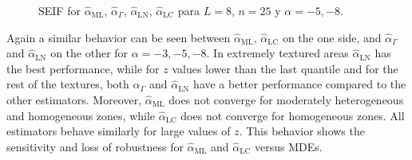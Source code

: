 \documentclass[twocolumn]{svjour3}
\begin{document}
\begin{figure}[htb]
	\centering
	\caption{\label{SEIFL8b}\small SEIF for $\widehat{\alpha}_{\text{{ML}}}$, $\widehat{\alpha}_{\Gamma}$, $\widehat{\alpha}_{\text{{LN}}}$, $\widehat{\alpha}_{\text{{LC}}}$ para $L=8$, $n=25$ y $\alpha=-5,-8$.}
\end{figure}

Again a similar behavior can be seen between $\widehat{\alpha}_{\text{{ML}}}$, $\widehat{\alpha}_{\text{{LC}}}$ on the one side, and $\widehat{\alpha}_{\Gamma}$ and $\widehat{\alpha}_{\text{{LN}}}$ on the other for $\alpha=-3, -5, -8$. 
In extremely textured areas $\widehat{\alpha}_{\text{{LN}}}$ has the best performance, while for $z$ values lower than the last quantile and for the rest of the textures, both $\widehat{\alpha}_{\Gamma}$ and $\widehat{\alpha}_{\text{{LN}}}$ have a better performance compared to the other estimators. 
Moreover, $\widehat{\alpha}_{\text{{ML}}}$ does not converge for moderately heterogeneous and homogeneous zones, while $\widehat{\alpha}_{\text{{LC}}}$ does not converge for homogeneous zones. All estimators behave similarly for large values of $z$. 
This behavior shows the sensitivity and loss of robustness for $\widehat{\alpha}_{\text{{ML}}}$ and $\widehat{\alpha}_{\text{{LC}}}$ versus MDEs.
\end{document}
